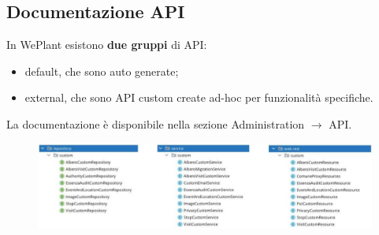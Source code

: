 \documentclass[a4paper]{article}
\begin{document}
	\subsection{Documentazione API}
	
	In WePlant esistono \textbf{due gruppi} di API:
	\begin{itemize}
		\item \textsf{default}, che sono auto generate;
		
		\item \textsf{external}, che sono API custom create ad-hoc per funzionalità specifiche.
	\end{itemize}
	La documentazione è disponibile nella sezione Administration $\rightarrow$ API.
	\begin{figure}[!htp]
		\centering
		\includegraphics[width=\textwidth]{img/we-plant/API.jpg}
	\end{figure}
\end{document}
